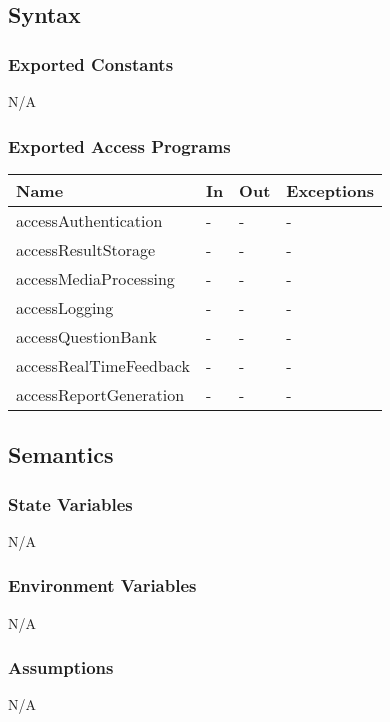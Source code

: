 \documentclass[12pt, titlepage]{article}
\begin{document}
\subsection{Syntax}

\subsubsection{Exported Constants}

N/A

\subsubsection{Exported Access Programs}

\begin{center}
\begin{tabular}{p{8cm} p{4cm} p{2cm} p{2cm}}
\hline
\textbf{Name} & \textbf{In} & \textbf{Out} & \textbf{Exceptions} \\
\hline
accessAuthentication & - & - & - \\
accessResultStorage & - & - & - \\
accessMediaProcessing & - & - & - \\
accessLogging & - & - & - \\
accessQuestionBank & - & - & - \\
accessRealTimeFeedback & - & - & - \\
accessReportGeneration & - & - & - \\
\hline
\end{tabular}
\end{center}

\subsection{Semantics}

\subsubsection{State Variables}
N/A

\subsubsection{Environment Variables}
N/A

\subsubsection{Assumptions}
N/A
\end{document}
